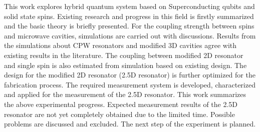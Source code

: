
\begin{eabstract}
  This work explores hybrid quantum system based on Superconducting qubits and solid state spins. Existing research and progress in this field is firstly summarized and the basic theory is briefly presented. For the coupling strength between spins and microwave cavities, simulations are carried out with discussions. Results from the simulations about CPW resonators and modified 3D cavities agree with existing results in the literature. The coupling between modified 2D resonator and single spin is also estimated from simulation based on existing design. The design for the modified 2D resonator (2.5D resonator) is further optimized for the fabrication process. The required measurement system is developed, characterized and applied for the measurement of the 2.5D resonator. This work summarizes the above experimental progress. Expected measurement results of the 2.5D resonator are not yet completely obtained due to the limited time. Possible problems are discussed and excluded. The next step of the experiment is planned.
\end{eabstract}

